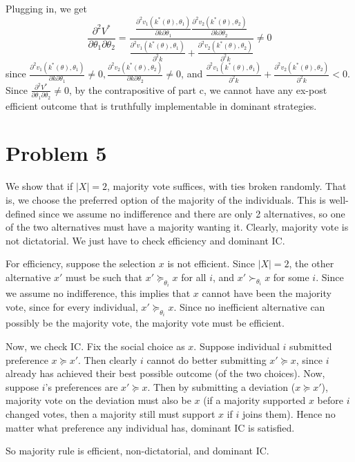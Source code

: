 \documentclass[10pt,letter]{article}
\begin{document}
\begin{enumerate}[label=(\alph*)]
  Plugging in, we get
  \[ \frac{\partial^2 V^*}{\partial \theta_1 \partial \theta_2} = \frac{\frac{\partial^2 v_1(k^*(\theta), \theta_1)}{\partial k \partial \theta_1}\frac{\partial^2 v_2(k^*(\theta), \theta_2)}{\partial k \partial \theta_2}}{\frac{\partial^2 v_1(k^*(\theta), \theta_1)}{\partial^2 k} + \frac{\partial^2 v_2(k^*(\theta), \theta_2)}{\partial^2 k}} \neq 0 \]
  since $\frac{\partial^2 v_1(k^*(\theta), \theta_1)}{\partial k \partial \theta_1} \neq 0, \frac{\partial^2 v_2(k^*(\theta), \theta_2)}{\partial k \partial \theta_2} \neq 0$, and $\frac{\partial^2 v_1(k^*(\theta), \theta_1)}{\partial^2 k} + \frac{\partial^2 v_2(k^*(\theta), \theta_2)}{\partial^2 k} < 0$.
  Since $\frac{\partial^2 V^*}{\partial \theta_1 \partial \theta_2 } \neq 0$, by the contrapositive of part c, we cannot have any ex-post efficient outcome that is truthfully implementable in dominant strategies.
  \end{enumerate}

\section*{Problem 5}
We show that if $|X| = 2$, majority vote suffices, with ties broken randomly. That is, we choose the preferred option of the majority of the individuals. This is well-defined since we assume no indifference and there are only 2 alternatives, so one of the two alternatives must have a majority wanting it. Clearly, majority vote is not dictatorial. We just have to check efficiency and dominant IC.

For efficiency, suppose the selection $x$ is not efficient. Since $|X| = 2$, the other alternative $x'$ must be such that $x' \succeq_{\theta_i} x$ for all $i$, and $x' \succ_{\theta_i} x$ for some $i$. Since we assume no indifference, this implies that $x$ cannot have been the majority vote, since for every individual, $x' \succeq_{\theta_i} x$. Since no inefficient alternative can possibly be the majority vote, the majority vote must be efficient.

Now, we check IC. Fix the social choice as $x$. Suppose individual $i$ submitted preference $x \succeq x'$. Then clearly $i$ cannot do better submitting $x' \succeq x$, since $i$ already has achieved their best possible outcome (of the two choices). Now, suppose $i$'s preferences are $x' \succeq x$. Then by submitting a deviation ($x \succeq x'$), majority vote on the deviation must also be $x$ (if a majority supported $x$ before $i$ changed votes, then a majority still must support $x$ if $i$ joins them). Hence no matter what preference any individual has, dominant IC is satisfied.

So majority rule is efficient, non-dictatorial, and dominant IC.
\end{document}
